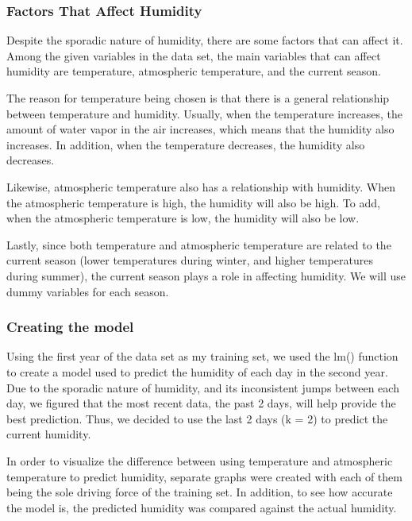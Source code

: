 \documentclass[12pt]{article}
\begin{document}
\subsubsection{Factors That Affect Humidity}
Despite the sporadic nature of humidity, there are some factors that can affect it. Among the given variables in the data set, the main variables that can affect humidity are temperature, atmospheric temperature, and the current season.  

The reason for temperature being chosen is that there is a general relationship between temperature and humidity. Usually, when the temperature increases, the amount of water vapor in the air increases, which means that the humidity also increases. In addition, when the temperature decreases, the humidity also decreases. 

Likewise, atmospheric temperature also has a relationship with humidity. When the atmospheric temperature is high, the humidity will also be high. To add, when the atmospheric temperature is low, the humidity will also be low.

Lastly, since both temperature and atmospheric temperature are related to the current season (lower temperatures during winter, and higher temperatures during summer), the current season plays a role in affecting humidity. We will use dummy variables for each season.

\subsubsection{Creating the model}

Using the first year of the data set as my training set, we used the lm() function to create a model used to predict the humidity of each day in the second year. Due to the sporadic  nature of humidity, and its inconsistent jumps between each day, we figured that the most recent data, the past 2 days, will help provide the best prediction. Thus, we decided to use the last 2 days (k = 2) to predict the current humidity.

In order to visualize the difference between using temperature and atmospheric temperature to predict humidity, separate graphs were created with each of them being the sole driving force of the training set. In addition, to see how accurate the model is, the predicted humidity was compared against the actual humidity.
\end{document}

